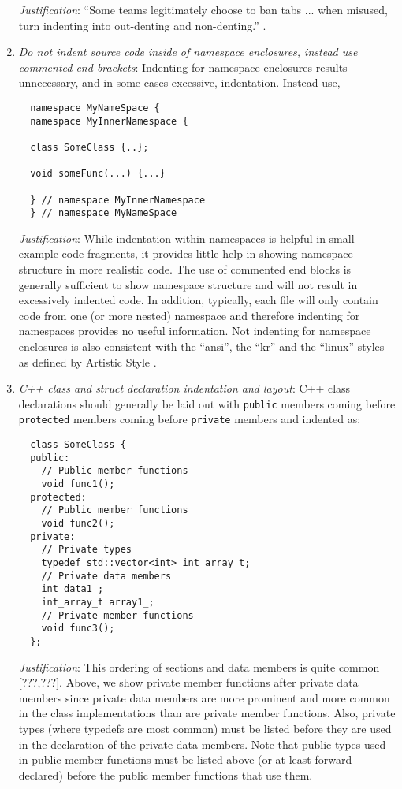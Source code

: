 \begin{enumerate}
{}\textit{Justification}: ``Some teams legitimately choose to ban tabs
... when misused, turn indenting into out-denting and non-denting.''
{}\cite[Item 0]{C++CodingStandards05}.

{}\item\textit{Do not indent source code inside of namespace enclosures,
instead use commented end brackets}: Indenting for namespace enclosures
results unnecessary, and in some cases excessive, indentation.  Instead use,

{\small\begin{verbatim}
  namespace MyNameSpace {
  namespace MyInnerNamespace {

  class SomeClass {..};

  void someFunc(...) {...}

  } // namespace MyInnerNamespace
  } // namespace MyNameSpace
\end{verbatim}}

{}\textit{Justification}: While indentation within namespaces is helpful in
small example code fragments, it provides little help in showing namespace
structure in more realistic code.  The use of commented end blocks is
generally sufficient to show namespace structure and will not result in
excessively indented code.  In addition, typically, each file will only
contain code from one (or more nested) namespace and therefore indenting for
namespaces provides no useful information.  Not indenting for namespace
enclosures is also consistent with the ``ansi'', the ``kr'' and the ``linux''
styles as defined by Artistic Style {}\cite{ArtisticStyle}.

{}\item\textit{C++ class and struct declaration indentation and layout}: C++
class declarations should generally be laid out with {}\texttt{public}
members coming before {}\texttt{protected} members coming before
{}\texttt{private} members and indented as:

{\small\begin{verbatim}
  class SomeClass {
  public:
    // Public member functions
    void func1();
  protected:
    // Public member functions
    void func2();
  private:
    // Private types
    typedef std::vector<int> int_array_t;
    // Private data members
    int data1_;
    int_array_t array1_;
    // Private member functions
    void func3();
  };
\end{verbatim}}

{}\textit{Justification}: This ordering of sections and data members is quite
common [???,???].  Above, we show private member functions after private data
members since private data members are more prominent and more common in the
class implementations than are private member functions.  Also, private types
(where typedefs are most common) must be listed before they are used in the
declaration of the private data members.  Note that public types used in
public member functions must be listed above (or at least forward declared)
before the public member functions that use them.


\end{enumerate}
